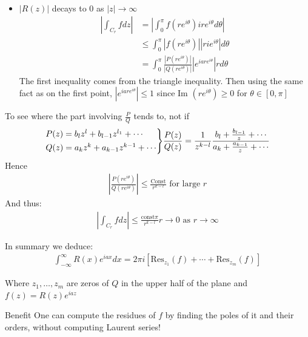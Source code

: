 \begin{parag}{$ $}
\begin{itemize}
	    \item $\left|R\left(z\right)\right|$ decays to 0 as $\left|z\right| \to \infty$
			\begin{align*} 
				\left|\int_{C_r}fdz\right| &=  \left|\int_0^{\pi}f\left(re^{i\theta}\right)ire^{i\theta}d\theta\right|\\
				&\leq \int_0^{\pi} \left|f\left(re^{i\theta}\right)\right| \left|rie^{i\theta}\right|d\theta\\
				&= \int_0^{\pi}\frac{\left|P\left(re^{i\theta}\right)\right|}{\left|Q\left(re^{i\theta}\right)\right|}\left|e^{iare^{i\theta}}\right|r d \theta
			\end{align*}
			The first inequality comes from the triangle inequality. Then using the same fact as on the first point, $\left|e^{iare^{i\theta}}\right| \leq 1$ since $\text{Im }\left(re^{i\theta}\right) \geq 0$ for $\theta \in \left[0, \pi\right]$
	\end{itemize}
	To see where the part involving $\frac{P}{Q}$ tends to, not if 
	\begin{align*} 
	\begin{rcases}
		P\left(z\right) = b_l z^{l} + b_{l-1}z^{l_1} + \cdots \\
		Q\left(z\right) = a_kz^{k} + a_{k-1}z^{k-1} + \cdots
	\end{rcases}
	\frac{P\left(z\right)}{Q\left(z\right)} = \frac{1}{z^{k-l}} \frac{b_l + \frac{b_{l-1}}{z} + \cdots}{ a_k + \frac{a_{k-1}}{z} + \cdots}
	\end{align*}
	Hence
	\begin{align*} 
		\left|\frac{P\left(re^{i\theta}\right)}{Q\left(re^{i\theta}\right)}\right| \leq \frac{\text{Const}}{r^{k-l}} \text{ for large } r
	\end{align*}
	And thus:
	\begin{align*} 
		\left|\int_{C_r}fdz\right| \leq \frac{\text{const} \pi}{r^{k-l}}r \to 0 \text{ as } r \to \infty
	\end{align*}
	
	In summary we deduce:
	\begin{align*} 
	\boxed{
		\int_{-\infty}^{\infty}R\left(x\right)e^{iax}dx =  2\pi i \left[\text{Res}_{z_1}\left(f\right) + \cdots + \text{Res}_{z_m}\left(f\right)  \right]
	} \end{align*}
	
	Where $z_1, \ldots, z_m$ are zeros of $Q$ in the upper half of the plane and $f\left(z\right) =  R\left(z\right)e^{iaz}$
	
	\begin{subparag}{Benefit}
	    One can compute the residues of $f$ by finding the poles of it and their orders, without computing Laurent series!
	\end{subparag}
\end{parag}
